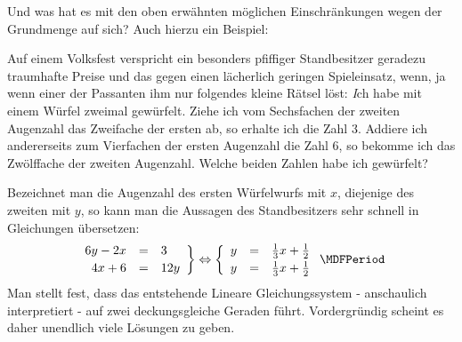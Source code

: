 \begin{MIntro}
Und was hat es mit den oben erwähnten möglichen Einschränkungen wegen der Grundmenge auf sich? Auch hierzu ein Beispiel:
\begin{MExample}
Auf einem Volksfest verspricht ein besonders pfiffiger Standbesitzer geradezu traumhafte Preise und das gegen einen
lächerlich geringen Spieleinsatz, wenn, ja wenn einer der Passanten ihm nur folgendes kleine Rätsel löst:
{\textit Ich habe mit einem Würfel zweimal gewürfelt. Ziehe ich vom Sechsfachen der zweiten Augenzahl das
Zweifache der ersten ab, so erhalte ich die Zahl $3$. Addiere ich andererseits zum Vierfachen der ersten
Augenzahl die Zahl $6$, so bekomme ich das Zwölffache der zweiten Augenzahl. Welche beiden Zahlen habe ich gewürfelt?}

Bezeichnet man die Augenzahl des ersten Würfelwurfs mit $x$, diejenige des zweiten mit $y$, so kann man die
Aussagen des Standbesitzers sehr schnell in Gleichungen übersetzen:
$$\left. \begin{array}{rcl} 6 y - 2 x & = & 3 \\[.5ex] 4 x + 6 & = & 12 y \end{array} \right\} \Leftrightarrow
\left\{ \begin{array}{rcl} y & = & \Mtfrac13 x + \Mtfrac12 \\[.5ex]
y & = & \Mtfrac13 x + \Mtfrac12 \end{array} \right. \MDFPeriod $$
Man stellt fest, dass das entstehende Lineare Gleichungssystem - anschaulich interpretiert - auf zwei
deckungsgleiche Geraden führt. Vordergründig scheint es daher unendlich viele Lösungen zu geben.


\end{MExample}
\end{MIntro}

